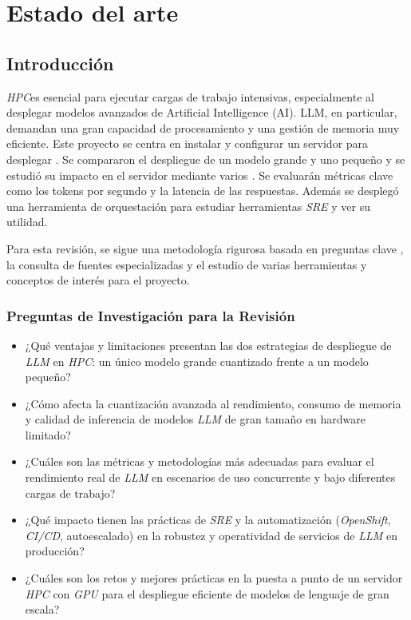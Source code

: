 \chapter{Estado del arte}

\section{Introducción}
\textit{HPC}es esencial para ejecutar cargas de trabajo intensivas, especialmente al desplegar modelos avanzados de Artificial Intelligence (AI). LLM, en particular, demandan una gran capacidad de procesamiento y una gestión de memoria muy eficiente. Este proyecto se centra en instalar y configurar un servidor  para desplegar . Se compararon el despliegue de un modelo grande y uno pequeño y se estudió su impacto en el servidor mediante varios \textit. Se evaluarán métricas clave como los tokens por segundo y la latencia de las respuestas. Además se desplegó una herramienta de orquestación para estudiar herramientas \textit{SRE} y ver su utilidad.

Para esta revisión, se sigue una metodología rigurosa basada en preguntas clave , la consulta de fuentes especializadas y el estudio de varias herramientas y conceptos de interés para el proyecto.
\subsection{Preguntas de Investigación para la Revisión}
\begin{itemize}
    \item ¿Qué ventajas y limitaciones presentan las dos estrategias de despliegue de \textit{LLM} en \textit{HPC}: un único modelo grande cuantizado frente a un modelo pequeño?
    \item ¿Cómo afecta la cuantización avanzada al rendimiento, consumo de memoria y calidad de inferencia de modelos \textit{LLM} de gran tamaño en hardware limitado?
    \item ¿Cuáles son las métricas y metodologías más adecuadas para evaluar el rendimiento real de \textit{LLM} en escenarios de uso concurrente y bajo diferentes cargas de trabajo?
    \item ¿Qué impacto tienen las prácticas de \textit{SRE} y la automatización (\textit{OpenShift}, \textit{CI/CD}, autoescalado) en la robustez y operatividad de servicios de \textit{LLM} en producción?
    \item ¿Cuáles son los retos y mejores prácticas en la puesta a punto de un servidor \textit{HPC} con \textit{GPU} para el despliegue eficiente de modelos de lenguaje de gran escala?
\end{itemize}

